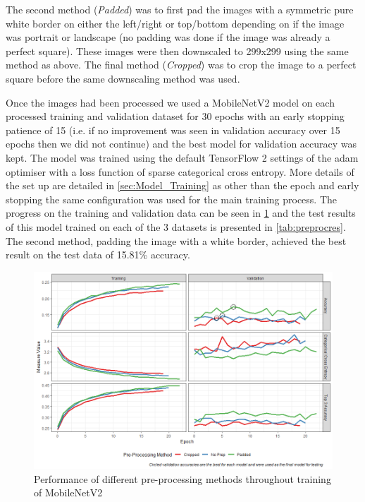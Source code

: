 \documentclass[12pt]{article}
\numberwithin{equation}{section}
\numberwithin{figure}{section}
\begin{document}
The second method (\emph{Padded}) was to first pad the images with a symmetric pure white border on either the left/right or top/bottom depending on if the image was portrait or landscape (no padding was done if the image was already a perfect square). These images were then downscaled to 299x299 using the same method as above. The final method (\emph{Cropped}) was to crop the image to a perfect square before the same downscaling method was used. 

Once the images had been processed we used a MobileNetV2 model on each processed training and validation dataset for 30 epochs with an early stopping patience of 15 (i.e. if no improvement was seen in validation accuracy over 15 epochs then we did not continue) and the best model for validation accuracy was kept. The model was trained using the default TensorFlow 2 settings of the adam optimiser with a loss function of sparse categorical cross entropy. More details of the set up are detailed in \cref{sec:Model_Training} as other than the epoch and early stopping the same configuration was used for the main training process. The progress on the training and validation data can be seen in \cref{fig:prep_perf} and the test results of this model trained on each of the 3 datasets is presented in \cref{tab:preprocres}. The second method, padding the image with a white border, achieved the best result on the test data of 15.81\% accuracy. 

\begin{figure}
	\centering
	\captionsetup{justification=centering}
	\includegraphics[scale=0.5]{prep_training.png}
	\caption{Performance of different pre-processing methods throughout training of MobileNetV2}
	\label{fig:prep_perf}
\end{figure}
\end{document}
